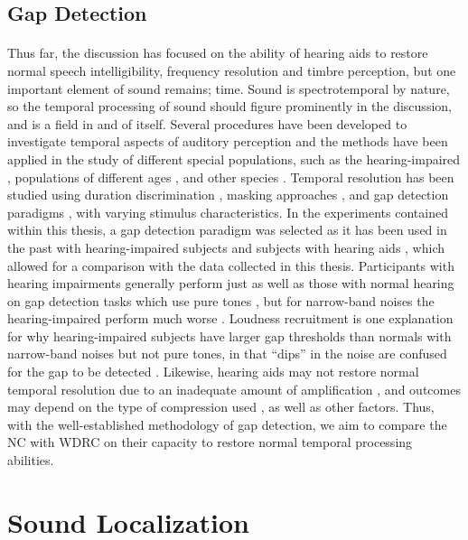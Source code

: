 \subsection{Gap Detection}
\paragraph{}Thus far, the discussion has focused on the ability of hearing aids to restore normal speech intelligibility, frequency resolution and timbre perception, but one important element of sound remains; time.  Sound is spectrotemporal by nature, so the temporal processing of sound should figure prominently in the discussion, and is a field in and of itself.  Several procedures have been developed to investigate temporal aspects of auditory perception and the methods have been applied in the study of different special populations, such as the hearing-impaired \cite{Glasberg1987}, populations of different ages \cite{Schneider1999, Smith2006}, and other species \cite{Church1976, Giraudi-Perry1982}.  Temporal resolution has been studied using duration discrimination \cite{Abel1972}, masking approaches \cite{Glasberg1987}, and gap detection paradigms \cite{Shailer1983}, with varying stimulus characteristics.  In the experiments contained within this thesis, a gap detection paradigm was selected as it has been used in the past with hearing-impaired subjects \cite{Fitzgibbons1982, Glasberg1987} and subjects with hearing aids \cite{Moore2001}, which allowed for a comparison with the data collected in this thesis.  Participants with hearing impairments generally perform just as well as those with normal hearing on gap detection tasks which use pure tones \cite{Moore1988}, but for narrow-band noises the hearing-impaired perform much worse \cite{Fitzgibbons1982}.  Loudness recruitment is one explanation for why hearing-impaired subjects have larger gap thresholds than normals with narrow-band noises but not pure tones, in that ``dips'' in the noise are confused for the gap to be detected \cite{Glasberg1992}.  Likewise, hearing aids may not restore normal temporal resolution due to an inadequate amount of amplification \cite{Nelson1997}, and outcomes may depend on the type of compression used \cite{Moore2001}, as well as other factors.  Thus, with the well-established methodology of gap detection, we aim to compare the NC with WDRC on their capacity to restore normal temporal processing abilities.

\section{Sound Localization}
